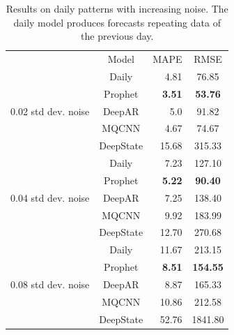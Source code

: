 \documentclass[a4paper, 12pt]{article} %
\newcommand{\ra}[1]{\renewcommand{\arraystretch}{#1}}
\begin{document}
	\begin{table}\centering 
		\ra{1.3}
		\begin{tabular}{@{}rcrc@{}}
			\cmidrule(l){1-4} %
			& Model & MAPE & RMSE\\
			\cmidrule(l){1-4} 
			\multirow{5}{*}{0.02 std dev. noise}
			& Daily & 4.81 & 76.85\\
			&Prophet & \textbf{3.51} & \textbf{53.76}\\
			&DeepAR & 5.0 & 91.82\\
			&MQCNN & 4.67 & 74.67\\
			&DeepState & 15.68 & 315.33\\
			
			\cmidrule(l){1-4} 
			\multirow{5}{*}{0.04 std dev. noise}
			& Daily & 7.23 & 127.10\\
			&Prophet & \textbf{5.22} & \textbf{90.40}\\
			&DeepAR & 7.25 & 138.40\\
			&MQCNN & 9.92 & 183.99\\
			&DeepState & 12.70 & 270.68\\
			
			\cmidrule(l){1-4} 
			\multirow{5}{*}{0.08 std dev. noise}
			& Daily & 11.67 & 213.15\\
			&Prophet & \textbf{8.51} & \textbf{154.55}\\
			&DeepAR & 8.87 & 165.33\\
			&MQCNN & 10.86 & 212.58\\
			&DeepState & 52.76 & 1841.80\\
			\bottomrule
		\end{tabular}
		\caption{Results on daily patterns with increasing noise. The daily model produces forecasts repeating data of the previous day.} \label{table:results_forecasting_daily_patterns}
	\end{table}
	
\end{document}

